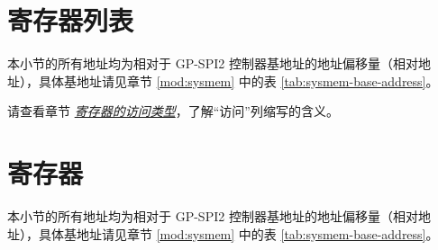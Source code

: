 \documentclass[main\_\_CN.tex]{subfiles}
\begin{document}
\hypertarget{spi-reg-summ}{}
\section{寄存器列表}
\label{sec:spi-reg-summ}



本小节的所有地址均为相对于 GP-SPI2 控制器基地址的地址偏移量（相对地址），具体基地址请见章节 \ref{mod:sysmem} \textit{} 中的表 \ref{tab:sysmem-base-address}。

请查看章节 \hyperref[glossary-access-types]{\textit{寄存器的访问类型}}，了解“访问”列缩写的含义。




\section{寄存器}\label{sec:spi-reg}

本小节的所有地址均为相对于 GP-SPI2 控制器基地址的地址偏移量（相对地址），具体基地址请见章节 \ref{mod:sysmem} \textit{} 中的表 \ref{tab:sysmem-base-address}。


\end{document}
